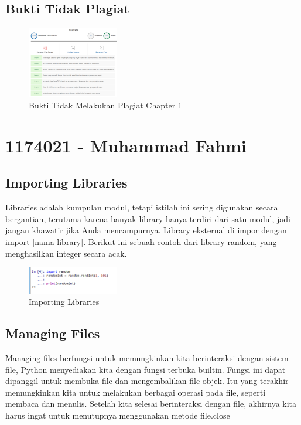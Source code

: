 \subsection{Bukti Tidak Plagiat}
\begin{figure}[H]
\centering
	\includegraphics[width=4cm]{figures/kelompok1/1/dzihan/plagiat.PNG}
	\caption{Bukti Tidak Melakukan Plagiat Chapter 1}
\end{figure}


\section{1174021 - Muhammad Fahmi}
\subsection{Importing Libraries}
Libraries adalah kumpulan modul, tetapi istilah ini sering digunakan secara bergantian, terutama karena banyak library hanya terdiri dari satu modul, jadi jangan khawatir jika Anda mencampurnya. Library eksternal di impor dengan import [nama library]. Berikut ini sebuah contoh dari library random, yang menghasilkan integer secara acak.
\hfill\break

\hfill\break

	\begin{figure}[H]
		\centering
		\includegraphics[width=4cm]{figures/kelompok1/1/1174021/tugas1/materi/2.PNG}
		\caption{Importing Libraries}
	\end{figure}

\subsection{Managing Files}
Managing files berfungsi untuk memungkinkan kita berinteraksi dengan sistem file, Python menyediakan kita dengan fungsi terbuka builtin. Fungsi ini dapat dipanggil untuk membuka file dan mengembalikan file objek. Itu
yang terakhir memungkinkan kita untuk melakukan berbagai operasi pada file, seperti membaca dan menulis. Setelah kita selesai berinteraksi dengan file, akhirnya kita harus ingat untuk menutupnya menggunakan metode file.close
\hfill\break

\hfill\break

